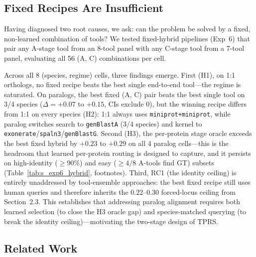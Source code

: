 \subsection{Fixed Recipes Are Insufficient}

Having diagnosed two root causes, we ask: can the problem be solved by a fixed, non-learned combination of tools? We tested fixed-hybrid pipelines (Exp~6) that pair any A-stage tool from an 8-tool panel with any C-stage tool from a 7-tool panel, evaluating all 56 (A, C) combinations per cell.



Across all 8 (species, regime) cells, three findings emerge. First (H1), on 1:1 orthologs, no fixed recipe beats the best single end-to-end tool---the regime is saturated. On paralogs, the best fixed (A, C) pair beats the best single tool on 3/4 species ($\Delta = +0.07$ to $+0.15$, CIs exclude 0), but the winning recipe differs from 1:1 on every species (H2): 1:1 always uses \texttt{miniprot+miniprot}, while paralog switches search to \texttt{genBlastA} (3/4 species) and kernel to \texttt{exonerate}/\texttt{spaln3}/\texttt{genBlastG}. Second (H3), the per-protein stage oracle exceeds the best fixed hybrid by $+0.23$ to $+0.29$ on all 4 paralog cells---this is the headroom that learned per-protein routing is designed to capture, and it persists on high-identity ($\ge 90\%$) and easy ($\ge 4/8$ A-tools find GT) subsets (Table~\ref{tab:s_exp6_hybrid}, footnotes). Third, RC1 (the identity ceiling) is entirely unaddressed by tool-ensemble approaches: the best fixed recipe still uses human queries and therefore inherits the 0.22--0.30 forced-locus ceiling from Section~2.3. This establishes that addressing paralog alignment requires both learned selection (to close the H3 oracle gap) and species-matched querying (to break the identity ceiling)---motivating the two-stage design of TPRS.

\subsection{Related Work}

